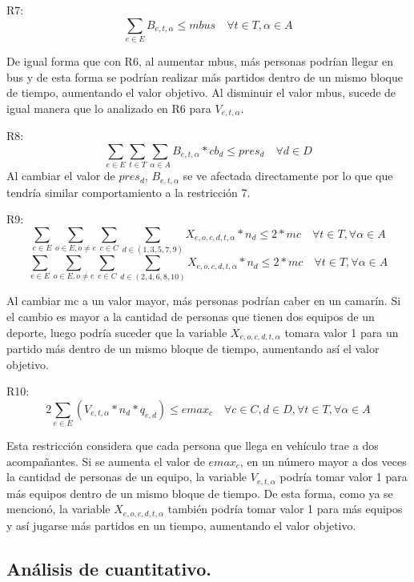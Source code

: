 R7: \[\sum_{e\in E}{B_{e,t,\alpha}}\leq mbus \quad \forall t\in T, \alpha\in A\]   

De igual forma que con R6, al aumentar mbus, más personas podrían llegar en bus y de esta forma se podrían realizar más partidos dentro de un mismo bloque de tiempo, aumentando el valor objetivo. Al disminuir el valor mbus, sucede de igual manera que lo analizado en R6 para $V_{e,t,\alpha}$.

R8: \[\sum_{e\in E}\sum_{t\in T}\sum_{\alpha \in A}{B_{e,t,\alpha}} * cb_ {d}\leq pres_{d}\quad \forall d\in D\]
Al cambiar el valor de $pres_d$, $B_{e,t,\alpha}$ se ve afectada directamente por lo que que tendría similar comportamiento a la restricción 7.


R9:     \[\sum_{e\in E}\sum_{o\in E,o\neq e}\sum_{c\in C}\sum_{d\in (1,3,5,7,9)}{X_{e,o,c,d,t,\alpha}*n_{d}} \leq 2*mc \quad \forall t\in T, \forall \alpha\in A\]
        \[\sum_{e\in E}\sum_{o\in E,o\neq e}\sum_{c\in C}\sum_{d\in (2,4,6,8,10)}{X_{e,o,c,d,t,\alpha}*n_{d}} \leq 2*mc \quad \forall t\in T, \forall \alpha\in A\]

Al cambiar mc a un valor mayor, más personas podrían caber en un camarín. Si el cambio es mayor a la cantidad de personas que tienen dos equipos de un deporte, luego podría suceder que la variable $X_{e,o,c,d,t,\alpha}$ tomara valor 1 para un partido más dentro de un mismo bloque de tiempo, aumentando así el valor objetivo. 


R10: \[2\sum_{e\in E}{(V_{e,t,\alpha}*n_{d}*q_{e,d})}  \leq emax_{c} \quad \forall c \in C, d\in D, \forall t \in T,\forall \alpha \in A\]

Esta restricción considera que cada persona que llega en vehículo trae a dos acompañantes. Si se aumenta el valor de $emax_c$, en un número mayor a dos veces la cantidad de personas de un equipo, la variable $V_{e,t,\alpha}$ podría tomar valor 1 para más equipos dentro de un mismo bloque de tiempo. De esta forma, como ya se mencionó, la variable $X_{e,o,c,d,t,\alpha}$ también podría tomar valor 1 para más equipos y así jugarse más partidos en un tiempo, aumentando el valor objetivo.


\subsection{Análisis de cuantitativo. }

